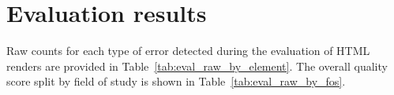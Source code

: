 \begin{table}[h!]
    \label{tab:quality_rubric}
\end{table}


\section{Evaluation results}
\label{app:eval_raw_results}

Raw counts for each type of error detected during the evaluation of HTML renders are provided in Table~\ref{tab:eval_raw_by_element}. The overall quality score split by field of study is shown in Table~\ref{tab:eval_raw_by_fos}.

